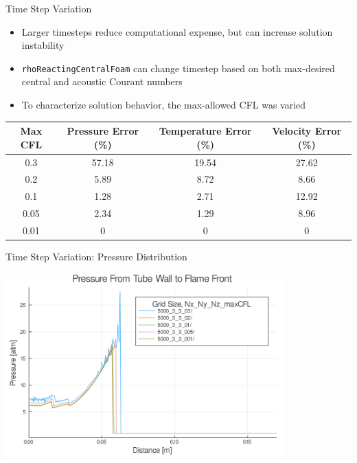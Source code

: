 \begin{frame}{Time Step Variation}
\begin{itemize}
\item Larger timesteps reduce computational expense, but can increase solution instability
\item \texttt{rhoReactingCentralFoam} can change timestep based on both max-desired central and acoustic Courant numbers
\item To characterize solution behavior, the max-allowed CFL was varied 
\end{itemize}
\begin{table}[]
\centering
\begin{tabular}{cccc}
Max CFL & Pressure Error (\%) & Temperature Error (\%) & Velocity Error (\%) \\ \hline
0.3 & 57.18 & 19.54 & 27.62 \\ 
0.2 & 5.89 & 8.72 & 8.66 \\
0.1 & 1.28 & 2.71 & 12.92 \\
0.05 & 2.34 & 1.29 & 8.96 \\
0.01 & 0 & 0 & 0 \\
\end{tabular}
\end{table}%
\end{frame}

\begin{frame}{Time Step Variation: Pressure Distribution}
\begin{center}
\includegraphics[width=0.8\textwidth]{../figs/cfl_test/p.png}
\end{center}
\end{frame}

